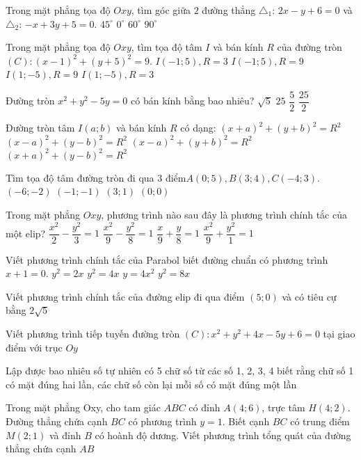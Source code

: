 \begin{ex}
Trong mặt phẳng tọa độ $Oxy$, tìm góc giữa $2$ đường thẳng $\triangle _1$: $2x-y+6=0$ và
$\triangle _2$: $-x+3y+5=0$.
\choice
{${{45}^\circ}$}
{$0^\circ$}
{${{60}^\circ}$}
{${{90}^\circ}$}
\end{ex}
\begin{ex}
Trong mặt phẳng tọa độ $Oxy$, tìm tọa độ tâm $I$ và bán kính $R$ của đường tròn $(C)\colon {{(x-1)}^2}+{{(y+5)}^2}=9$.
\choice
{$I(-1;5),R=3$}
{$I(-1;5),R=9$}
{$I\left(1;-5\right),R=9$}
{$I\left(1;-5\right),R=3$}
\end{ex}
\begin{ex}
Đường tròn $x^2+y^2-5y=0$ có bán kính bằng bao nhiêu?
\choice
{$\sqrt{5}$}
{$25$}
{$\dfrac{5}{2}$}
{$\dfrac{25}{2}$}
\end{ex}
\begin{ex}
Đường tròn tâm $I(a;b)$ và bán kính $R$ có dạng:
\choice
{${{(x+a)}^2}+{{(y+b)}^2}=R^2$}
{${{(x-a)}^2}+{{(y-b)}^2}=R^2$}
{${{(x-a)}^2}+{{(y+b)}^2}=R^2$}
{${{(x+a)}^2}+{{(y-b)}^2}=R^2$}
\end{ex}
\begin{ex}
Tìm tọa độ tâm đường tròn đi qua $3$ điểm$A(0;5),B(3;4),C(-4;3)$.
\choice
{$(-6;-2)$}
{$(-1;-1)$}
{$(3;1)$}
{$(0;0)$}
\end{ex}
\begin{ex}
Trong mặt phẳng $Oxy$, phương trình nào sau đây là phương trình chính tắc của một elip?
\choice
{$\dfrac{x^2}{2}-\dfrac{y^2}{3}=1$}
{$\dfrac{x^2}{9}-\dfrac{y^2}{8}=1$}
{$\dfrac{x}{9}+\dfrac{y}{8}=1$}
{$\dfrac{x^2}{9}+\dfrac{y^2}{1}=1$}
\end{ex}
\begin{ex}
Viết phương trình chính tắc của Parabol biết đường chuẩn có phương trình $x+1=0$.
\choice
{$y^2=2x$}
{$y^2=4x$}
{$y=4x^2$}
{$y^2=8x$}
\end{ex}

\begin{ex}
Viết phương trình chính tắc của đường elip đi qua điểm $(5;0)$ và có tiêu cự bằng $2\sqrt{5}$
\end{ex}
\begin{ex}
Viết phương trình tiếp tuyến đường tròn $(C)\colon x^2+y^2+4x-5y+6=0$ tại giao điểm với trục $Oy$
\end{ex}
\begin{ex}
Lập được bao nhiêu số tự nhiên có 5 chữ số từ các số 1, 2, 3, 4 biết rằng chữ số 1 có mặt đúng hai lần, các chữ số còn lại mỗi số có mặt đúng một lần
\end{ex}
\begin{ex}
Trong mặt phẳng Oxy, cho tam giác $ABC$ có đỉnh $A(4;6)$, trực tâm $H(4;2)$. Đường thẳng chứa cạnh $BC$ có phương trình $y=1$. Biết cạnh $BC$ có trung điểm $M(2;1)$ và đỉnh $B$ có hoành độ dương. Viết phương trình tổng quát của đường thẳng chứa cạnh $AB$
\end{ex}


